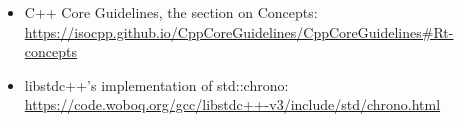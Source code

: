 \begin{itemize}
\item
C++ Core Guidelines, the section on Concepts: \url{https://isocpp.github.io/CppCoreGuidelines/CppCoreGuidelines#Rt-concepts}
	
\item
libstdc++'s implementation of std::chrono: \url{https://code.woboq.org/gcc/libstdc++-v3/include/std/chrono.html}
\end{itemize}